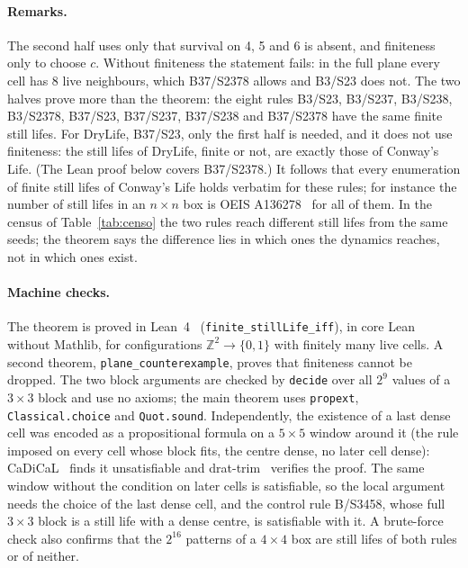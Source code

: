 \documentclass[11pt,a4paper]{article}
\begin{document}
\paragraph{Remarks.} The second half uses only that survival on 4, 5 and 6 is absent, and
finiteness only to choose $c$. Without finiteness the statement fails: in the full plane
every cell has 8 live neighbours, which B37/S2378 allows and B3/S23 does not. The two
halves prove more than the theorem: the eight rules B3/S23, B3/S237, B3/S238, B3/S2378,
B37/S23, B37/S237, B37/S238 and B37/S2378 have the same finite still lifes. For DryLife,
B37/S23, only the first half is needed, and it does not use finiteness: the still lifes of
DryLife, finite or not, are exactly those of Conway's Life. (The Lean proof below covers
B37/S2378.) It follows
that every enumeration of finite still lifes of Conway's Life holds verbatim for these
rules; for instance the number of still lifes in an $n\times n$ box is OEIS
A136278~\cite{a136278} for all of them. In the census of Table~\ref{tab:censo} the two rules
reach different still lifes from the same seeds; the theorem says the difference lies in
which ones the dynamics reaches, not in which ones exist.

\paragraph{Machine checks.} The theorem is proved in Lean~4~\cite{lean4}
(\texttt{finite\_stillLife\_iff}), in core Lean without Mathlib, for configurations
$\mathbb{Z}^2\to\{0,1\}$ with finitely many live cells. A second theorem,
\texttt{plane\_counterexample}, proves that finiteness cannot be dropped. The two block arguments are checked by
\texttt{decide} over all $2^9$ values of a $3\times3$ block and use no axioms; the main
theorem uses \texttt{propext}, \texttt{Classical.choice} and \texttt{Quot.sound}.
Independently, the existence of a last dense cell was encoded as a propositional formula on
a $5\times5$ window around it (the rule imposed on every cell whose block fits, the centre
dense, no later cell dense): CaDiCaL~\cite{cadical} finds it unsatisfiable and
drat-trim~\cite{drattrim} verifies the proof. The same window without the condition on later
cells is satisfiable, so the local argument needs the choice of the last dense cell, and
the control rule B/S3458, whose full $3\times3$ block is a still life with a dense
centre, is satisfiable with it. A brute-force check also confirms that the $2^{16}$ patterns
of a $4\times4$ box are still lifes of both rules or of neither.
\end{document}
